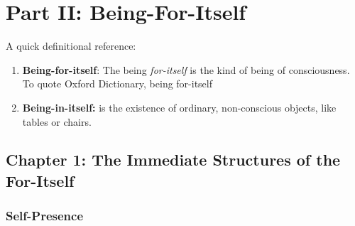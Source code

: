 \section{Part II: Being-For-Itself}

A quick definitional reference:

\begin{enumerate}
  \item \textbf{Being-for-itself}: The being \emph{for-itself} is the kind of being of consciousness. To quote Oxford Dictionary, being for-itself 
  \item \textbf{Being-in-itself:} is the existence of ordinary, non-conscious objects, like tables or chairs.
\end{enumerate}

\subsection{Chapter 1: The Immediate Structures of the For-Itself}

\subsubsection{Self-Presence}

